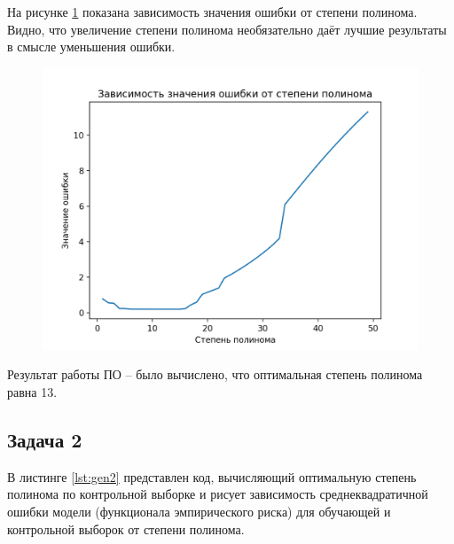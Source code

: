 \documentclass[12pt]{report}
\begin{document}
На рисунке \ref{fig:points3} показана зависимость значения ошибки от степени полинома. Видно, что увеличение степени полинома необязательно даёт лучшие результаты в смысле уменьшения ошибки. 

\begin{figure}[h!]
  \centering
  \includegraphics[width = \linewidth]{res.png}
  \caption{}
  \label{fig:points3}
\end{figure}
\newpage

Результат работы ПО -- было вычислено, что оптимальная степень полинома равна 13.

\newpage
\subsection{Задача 2}


В листинге \ref{lst:gen2} представлен код, вычисляющий оптимальную степень полинома по контрольной выборке и рисует зависимость среднеквадратичной ошибки модели (функционала эмпирического риска) для обучающей и контрольной выборок от степени полинома.
\end{document}
